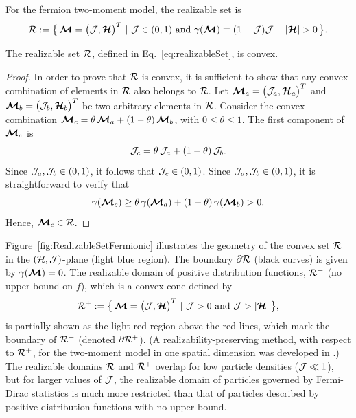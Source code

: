 \begin{define}
  For the fermion two-moment model, the realizable set is
  \begin{equation}
    \mathcal{R}:=\big\{\,\boldsymbol{\mathcal{M}}=\big(\mathcal{J},\boldsymbol{\mathcal{H}}\big)^{T}~|~\mathcal{J}\in(0,1)~\text{and}~\gamma(\boldsymbol{\mathcal{M}})\equiv(1-\mathcal{J})\mathcal{J}-|\boldsymbol{\mathcal{H}}| > 0\,\big\}.
    \label{eq:realizableSet}
  \end{equation}
\end{define}

\begin{lemma}
  The realizable set $\mathcal{R}$, defined in Eq.~\eqref{eq:realizableSet}, is convex.  
\end{lemma}
\begin{proof}
  In order to prove that $\mathcal{R}$ is convex, it is sufficient to show that any convex combination of elements in $\mathcal{R}$ also belongs to $\mathcal{R}$.  
  Let $\boldsymbol{\mathcal{M}}_{a}=\big(\mathcal{J}_{a},\boldsymbol{\mathcal{H}}_{a}\big)^{T}$ and $\boldsymbol{\mathcal{M}}_{b}=\big(\mathcal{J}_{b},\boldsymbol{\mathcal{H}}_{b}\big)^{T}$ be two arbitrary elements in $\mathcal{R}$.  
  Consider the convex combination $\boldsymbol{\mathcal{M}}_{c} = \theta\,\boldsymbol{\mathcal{M}}_{a} + (1-\theta)\,\boldsymbol{\mathcal{M}}_{b}$, with $0\leq\theta\leq1$.
  The first component of $\boldsymbol{\mathcal{M}}_{c}$ is
  \begin{equation*}
    \mathcal{J}_{c} = \theta\,\mathcal{J}_{a} + (1-\theta)\,\mathcal{J}_{b}.
  \end{equation*}
  Since $\mathcal{J}_{a},\mathcal{J}_{b} \in (0,1)$, it follows that $\mathcal{J}_{c} \in (0,1)$.  
  Since $\mathcal{J}_{a},\mathcal{J}_{b} \in (0,1)$, it is straightforward to verify that
  \begin{equation*}
  \gamma(\boldsymbol{\mathcal{M}}_{c}) \geq \theta\,\gamma(\boldsymbol{\mathcal{M}}_{a}) + (1-\theta)\,\gamma(\boldsymbol{\mathcal{M}}_{b}) > 0.
  \end{equation*}
  Hence, $\boldsymbol{\mathcal{M}}_{c}\in\mathcal{R}$.
\end{proof}

Figure~\ref{fig:RealizableSetFermionic} illustrates the geometry of the convex set $\mathcal{R}$ in the $(\mathcal{H},\mathcal{J})$-plane (light blue region).  
The boundary $\partial\mathcal{R}$ (black curves) is given by $\gamma(\boldsymbol{\mathcal{M}})=0$.  
The realizable domain of positive distribution functions, $\mathcal{R}^{+}$ (no upper bound on $f$), which is a convex cone defined by
\begin{equation}
  \mathcal{R}^{+}:=\big\{\,\boldsymbol{\mathcal{M}}=\big(\mathcal{J},\boldsymbol{\mathcal{H}}\big)^{T}~|~\mathcal{J} > 0~\text{and}~\mathcal{J} > |\boldsymbol{\mathcal{H}}|\,\big\}, 
  \label{eq:realizableSetPositive}
\end{equation}
is partially shown as the light red region above the red lines, which mark the boundary of $\mathcal{R}^{+}$ (denoted $\partial\mathcal{R}^{+}$).  
(A realizability-preserving method, with respect to $\mathcal{R}^{+}$, for the two-moment model in one spatial dimension was developed in \cite{olbrant_etal_2012}.)  
The realizable domains $\mathcal{R}$ and $\mathcal{R}^{+}$ overlap for low particle densities ($\mathcal{J}\ll1$), but for larger values of $\mathcal{J}$, the realizable domain of particles governed by Fermi-Dirac statistics is much more restricted than that of particles described by positive distribution functions with no upper bound.  

